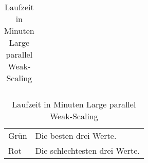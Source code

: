 \begin{table}[ht]
{\begin{tabular}{lrrrrrrrrrrrrrrrrrrrrr}
\bottomrule
\end{tabular}
}
\caption{Laufzeit in Minuten Large parallel Weak-Scaling}
\label{messung:tab:time-large-par-weak}
\begin{tabular}{ll}
{\color{green}Grün} & Die besten drei Werte.\\
{\color{red}Rot} & Die schlechtesten drei Werte.\\
\end{tabular}
\end{table}
